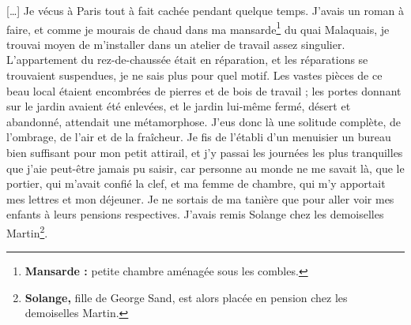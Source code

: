 
	{
	
	[…] Je vécus à Paris tout à fait cachée pendant quelque temps. J’avais un roman à faire, et comme je mourais de chaud dans ma mansarde\footnote{\textbf{Mansarde :} petite chambre aménagée sous les combles.} du quai Malaquais, je trouvai moyen de m’installer dans un atelier de travail assez singulier. L’appartement du rez-de-chaussée était en réparation, et les réparations se trouvaient suspendues, je ne sais plus pour quel motif. Les vastes pièces de ce beau local étaient encombrées de pierres et de bois de travail ; les portes donnant sur le jardin avaient été enlevées, et le jardin lui-même fermé, désert et abandonné, attendait une métamorphose. J’eus donc là une solitude complète, de l’ombrage, de l’air et de la fraîcheur. Je fis de l’établi d’un menuisier un bureau bien suffisant pour mon petit attirail, et j’y passai les journées les plus tranquilles que j’aie peut-être jamais pu saisir, car personne au monde ne me savait là, que le portier, qui m’avait confié la clef, et ma femme de chambre, qui m’y apportait mes lettres et mon déjeuner. Je ne sortais de ma tanière que pour aller voir mes enfants à leurs pensions respectives. J’avais remis Solange chez les demoiselles Martin\footnote{\textbf{Solange,} fille de George Sand, est alors placée en pension chez les demoiselles Martin.}.
	
}
